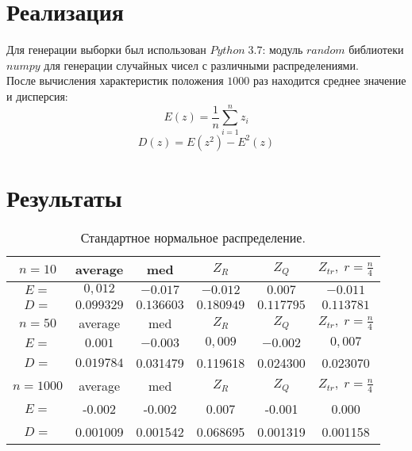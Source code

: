 \documentclass[a4]{article}
\begin{document}
	\section{Реализация}
	Для генерации выборки был использован $Python\;3.7$: модуль $random$ библиотеки $numpy$ для генерации случайных чисел с различными распределениями.\\
	После вычисления характеристик положения $1000$ раз находится среднее значение и дисперсия: 
	\begin{equation}
	E(z) = \frac{1}{n}\sum_{i=1}^n z_i
	\end{equation} 
	\begin{equation}
	D(z) = E\left(z^2\right) - E^2(z)
	\end{equation}
	
	\section{Результаты}
		\begin{table}[h]
			\caption{ Стандартное нормальное распределение.}
			\begin{center}
				\begin{tabular}{|c|c|c|c|c|c|}
					\hline
					$n = 10$ & average & med & $Z_R$ & $Z_Q$ & $Z_{tr},\;r=\frac{n}{4}$\\
					\hline
					$E =$ & $0,012$ & $-0.017$ &        $-0.012$ &       $0.007$ &         $-0.011$\\
					\hline
					$D =$ & $0.099329$&         $0.136603$        & $0.180949$     &    $0.117795$      &   $0.113781$\\
					\hline
					$n = 50$ & average & med & $Z_R$ & $Z_Q$ & $Z_{tr},\;r=\frac{n}{4}$\\
					\hline
					$E =$ & $0.001$ & $-0.003$ & $0,009$ & $-0.002$ & $0,007$\\
					\hline
					$D =$ & $0.019784$&         0.031479        & 0.119618      &   0.024300       &  0.023070\\
					\hline
					$n = 1000$ & average & med & $Z_R$ & $Z_Q$ & $Z_{tr},\;r=\frac{n}{4}$\\
					\hline
					$E =$ & -0.002       & -0.002&        0.007&         -0.001&        0.000\\
					\hline
					$D =$ & 0.001009        & 0.001542       &  0.068695       &  0.001319       &  0.001158\\
					\hline
				\end{tabular}
			\end{center}
		\end{table}
\end{document}
